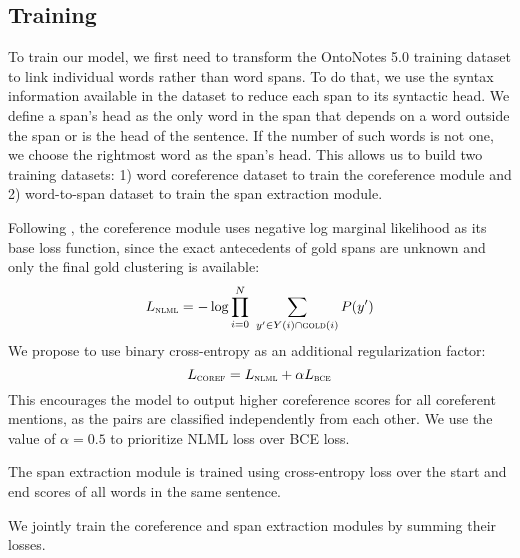 \documentclass[11pt]{article}
\begin{document}
\subsection{Training}
To train our model, we first need to transform the OntoNotes 5.0 training dataset to link individual words rather than word spans. To do that, we use the syntax information available in the dataset to reduce each span to its syntactic head. We define a span's head as the only word in the span that depends on a word outside the span or is the head of the sentence. If the number of such words is not one, we choose the rightmost word as the span's head. This allows us to build two training datasets: 1) word coreference dataset to train the coreference module and 2) word-to-span dataset to train the span extraction module.

Following \citet{lee-etal-2017-end}, the coreference module uses negative log marginal likelihood as its base loss function, since the exact antecedents of gold spans are unknown and only the final gold clustering is available:
\begin{equation}
    L_{\textsc{nlml}} = -\log \prod_{i = 0}^{N} \ \sum_{y' \in Y(i) \cap \textsc{gold}(i)} P(y')
\end{equation}
We propose to use binary cross-entropy as an additional regularization factor:
\begin{equation}
    L_\textsc{coref} = L_\textsc{nlml} + \alpha L_\textsc{bce}
\end{equation}
This encourages the model to output higher coreference scores for all coreferent mentions, as the pairs are classified independently from each other. We use the value of $\alpha = 0.5$ to prioritize NLML loss over BCE loss.

The span extraction module is trained using cross-entropy loss over the start and end scores of all words in the same sentence.

We jointly train the coreference and span extraction modules by summing their losses.
\end{document}
